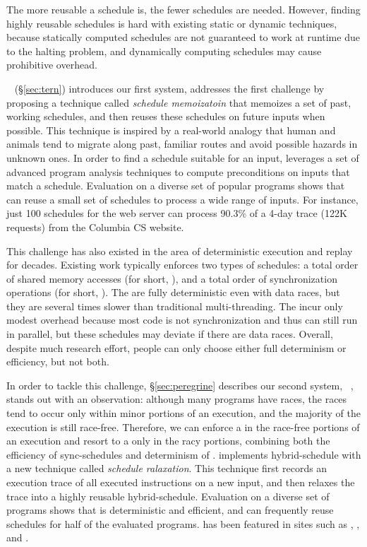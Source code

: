  The more reusable a schedule is, the fewer schedules are needed.
However, finding highly reusable schedules is hard with existing static or
dynamic techniques, because statically computed schedules are not guaranteed to
work at runtime due to the halting problem, and dynamically computing schedules
may cause prohibitive overhead.

\tern~\cite{cui:tern:osdi10} (\S\ref{sec:tern}) introduces our first \smt
system, addresses the first challenge by proposing a technique called
\emph{schedule memoizatoin} that memoizes a set of past, working schedules, and
then 
reuses these schedules on future inputs when possible. This technique is
inspired
by a real-world analogy that human and animals tend to migrate along past,
familiar routes
and avoid possible hazards in unknown ones. In order to find a schedule 
suitable for an input, \tern leverages a set of advanced program 
analysis techniques to compute preconditions on inputs that match a schedule. 
Evaluation on a diverse set of popular programs shows that \tern can
reuse a small set of schedules to process a wide range of inputs. For 
instance, just 100 schedules for the \apache web server can process 90.3\% of a
4-day 
trace (122K requests) from the Columbia CS website.

 This challenge has also existed in the area of deterministic
execution and replay for decades. Existing work typically enforces two types of
schedules: a total order of shared memory accesses (for short, \memsched), and a
total order of synchronization operations (for 
short, \syncsched). The \memscheds are fully deterministic even with 
data races, but they are several times slower than traditional multi-threading.
The \syncscheds incur only modest overhead because most code is 
not synchronization and thus can still run in parallel, but these schedules may
deviate if there are data races. Overall, despite much research effort, people
can only choose either full determinism or efficiency, but not both.

In order to tackle this challenge,  \S\ref{sec:peregrine} describes our second
\smt system, \peregrine~\cite{peregrine:sosp11}, 
stands out with an observation: although many programs have races, the 
races tend to occur only within minor portions of an execution, and the 
majority of the execution is still race-free. Therefore, we can enforce a
\syncscheds
in the race-free portions of an execution and resort to a \memsched only in the
racy portions,
combining both the efficiency of sync-schedules and determinism of \memscheds. 
\peregrine implements hybrid-schedule with
a new technique called \emph{schedule ralaxation}. This technique first records
an execution 
trace of all executed instructions on a new input, and then relaxes 
the trace into a highly reusable hybrid-schedule. Evaluation on a diverse set of
programs shows that 
\peregrine is deterministic and efficient, and can frequently reuse schedules 
for half of the evaluated programs. \peregrine has been featured in sites such 
as \acmtechnews, \tgdaily, and \physorg.

